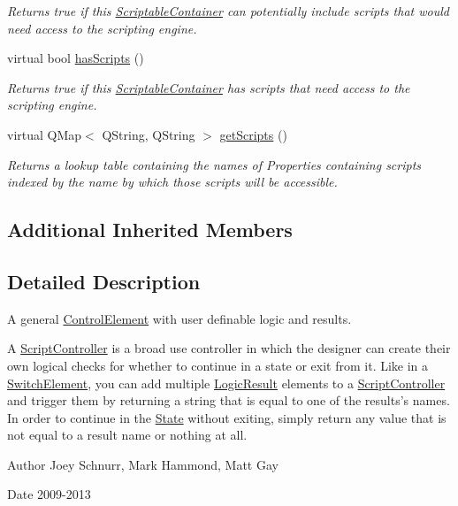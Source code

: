 \begin{DoxyCompactItemize}
\begin{DoxyCompactList}\small\item\em Returns true if this \hyperlink{class_picto_1_1_scriptable_container}{Scriptable\-Container} can potentially include scripts that would need access to the scripting engine. \end{DoxyCompactList}\item 
virtual bool \hyperlink{class_picto_1_1_script_controller_af2c140e4c6f20c01bfcff27459ad624b}{has\-Scripts} ()
\begin{DoxyCompactList}\small\item\em Returns true if this \hyperlink{class_picto_1_1_scriptable_container}{Scriptable\-Container} has scripts that need access to the scripting engine. \end{DoxyCompactList}\item 
virtual Q\-Map$<$ Q\-String, Q\-String $>$ \hyperlink{class_picto_1_1_script_controller_a96c4021832e13bb6ab7727ac3646af92}{get\-Scripts} ()
\begin{DoxyCompactList}\small\item\em Returns a lookup table containing the names of Properties containing scripts indexed by the name by which those scripts will be accessible. \end{DoxyCompactList}\end{DoxyCompactItemize}
\subsection*{Additional Inherited Members}


\subsection{Detailed Description}
A general \hyperlink{class_picto_1_1_control_element}{Control\-Element} with user definable logic and results. 

A \hyperlink{class_picto_1_1_script_controller}{Script\-Controller} is a broad use controller in which the designer can create their own logical checks for whether to continue in a state or exit from it. Like in a \hyperlink{class_picto_1_1_switch_element}{Switch\-Element}, you can add multiple \hyperlink{class_picto_1_1_logic_result}{Logic\-Result} elements to a \hyperlink{class_picto_1_1_script_controller}{Script\-Controller} and trigger them by returning a string that is equal to one of the results's names. In order to continue in the \hyperlink{class_picto_1_1_state}{State} without exiting, simply return any value that is not equal to a result name or nothing at all. \begin{DoxyAuthor}{Author}
Joey Schnurr, Mark Hammond, Matt Gay 
\end{DoxyAuthor}
\begin{DoxyDate}{Date}
2009-\/2013 
\end{DoxyDate}


